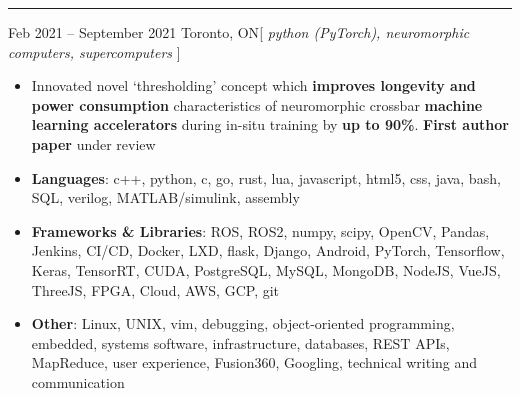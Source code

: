 \documentclass[10pt,a4paper,ragged2e,withhyper]{altacv}
\begin{document}
{\color{accent}\hrule \vspace{0.1cm}}
 {Feb 2021 -- September 2021} {Toronto, ON}{\hspace{-1cm}[ \textit{python (PyTorch), neuromorphic computers, supercomputers} ]}
\begin{itemize}
  \item Innovated novel `thresholding' concept which \textbf{improves longevity and power consumption} characteristics of neuromorphic  crossbar \textbf{machine learning accelerators} during in-situ training by \textbf{up to 90\%}. \textbf{First author paper} under review
\end{itemize}


\begin{itemize}
  \item \textbf{Languages}:
    c++, python, c, go, rust, 
    lua, javascript, html5, css, java, bash,
    SQL, verilog, MATLAB/simulink, assembly
   \item \textbf{Frameworks \& Libraries}:
     ROS, ROS2, numpy, scipy, OpenCV, Pandas,
     Jenkins, CI/CD, Docker, LXD, %
     flask, Django, Android,
     PyTorch, Tensorflow, Keras, TensorRT, CUDA,
     PostgreSQL, MySQL, MongoDB,
     NodeJS, VueJS, ThreeJS,
     FPGA,  Cloud,
     AWS, GCP, git
   \item \textbf{Other}: Linux, UNIX, vim, debugging,
     object-oriented programming, embedded,
     systems software, 
     infrastructure, databases,
     REST APIs, MapReduce,
     user experience,
     Fusion360,
     Googling, 
     technical writing and communication

\end{itemize}
\end{document}

